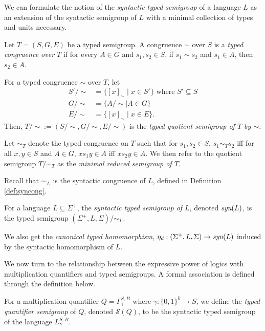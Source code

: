 \documentclass[a4paper,UKenglish,cleveref, autoref, thm-restate, anonymous]{lipics-v2021}
\begin{document}
We can formulate the notion of the \emph{syntactic typed semigroup} of a language $L$ as an extension of the syntactic semigroup of $L$ with a minimal collection of types and units necessary.
\begin{definition}\label{def:typedcongmin}
    Let $T = (S, G, E)$ be a typed semigroup. A congruence $\sim$ over $S$ is a \emph{typed congruence over $T$} if for every $A \in G$ and $s_1,s_2\in S$, if $s_1 \sim s_2$ and $s_1 \in A$, then $s_2 \in A$.

    For a typed congruence $\sim$ over $T$, let
    \begin{align*}
        S'/{\sim} &= \{[x]_\sim \mid x \in S'\} \text{ where $S' \subseteq S$}\\
        G/{\sim} &= \{A/{\sim} \mid A \in G\}\\
        E/{\sim} &= \{[x]_\sim \mid x \in E\}.
    \end{align*}
    \noindent Then, $T/{\sim} := (S/{\sim}, G/{\sim}, E/{\sim})$ is the \emph{typed quotient semigroup of $T$ by $\sim$}.

    Let $\sim_T$ denote the typed congruence on $T$ such that for $s_1,s_2 \in S$, $s_1 \sim_T s_2$ iff for all $x,y \in S$ and $A \in G$, $xs_1y \in A$ iff $xs_2y \in A$. We then refer to the quotient semigroup $T/{\sim_T}$ as the \emph{minimal reduced semigroup of $T$}.
\end{definition}

Recall that ${\sim_L}$ is the syntactic congruence of $L$, defined in Definition \ref{def:syncong}.
\begin{definition}
    For a language $L \subseteq \Sigma^+$, the \emph{syntactic typed semigroup of $L$}, denoted $\emph{syn}(L)$, is the typed semigroup $(\Sigma^+, L, \Sigma)/{\sim_L}$. 
\end{definition} 
    We also get the \emph{canonical typed homomorphism}, $\eta_d : (\Sigma^+, L, \Sigma) \rightarrow \emph{syn}(L)$ induced by the syntactic homomorphism of $L$.


We now turn to the relationship between the expressive power of logics with multiplication quantifiers and typed semigroups.  A formal association is defined through the definition below.

\begin{definition}\label{def:origtypedquantsemi}
    For a multiplication quantifier $Q=\Gamma^{S,B}_{\gamma}$ where $\gamma : \{0,1\}^k \rightarrow S$, we define the \emph{typed quantifier semigroup} of $Q$, denoted $\mathcal{S}(Q)$, to be the syntactic typed semigroup of the language $L^{S,B}_{\gamma}$.  
\end{definition}
\end{document}

